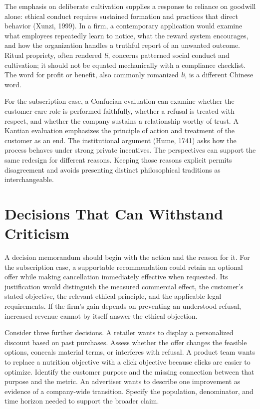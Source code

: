 The emphasis on deliberate cultivation supplies a response to reliance
on goodwill alone: ethical conduct requires sustained formation and
practices that direct behavior (Xunzi, 1999). In a firm, a contemporary
application would examine what employees repeatedly learn to notice,
what the reward system encourages, and how the organization handles a
truthful report of an unwanted outcome. Ritual propriety, often rendered
\emph{li}, concerns patterned social conduct and cultivation; it should
not be equated mechanically with a compliance checklist. The word for
profit or benefit, also commonly romanized \emph{li}, is a different
Chinese word.

For the subscription case, a Confucian evaluation can examine whether
the customer-care role is performed faithfully, whether a refusal is
treated with respect, and whether the company sustains a relationship
worthy of trust. A Kantian evaluation emphasizes the principle of action
and treatment of the customer as an end. The institutional argument
(Hume, 1741) asks how the process behaves under strong private
incentives. The perspectives can support the same redesign for different
reasons. Keeping those reasons explicit permits disagreement and avoids
presenting distinct philosophical traditions as interchangeable.


\hypertarget{M09-decisions-that-can-withstand-criticism}{%
\section{Decisions That Can Withstand
Criticism}\label{M09-decisions-that-can-withstand-criticism}}

\noindent \noindent A decision memorandum should begin with the action and the
reason for it. For the subscription case, a supportable recommendation
could retain an optional offer while making cancellation immediately
effective when requested. Its justification would distinguish the
measured commercial effect, the customer's stated objective, the
relevant ethical principle, and the applicable legal requirements. If
the firm's gain depends on preventing an understood refusal, increased
revenue cannot by itself answer the ethical objection.

Consider three further decisions. A retailer wants to display a
personalized discount based on past purchases. Assess whether the offer
changes the feasible options, conceals material terms, or interferes
with refusal. A product team wants to replace a nutrition objective with
a click objective because clicks are easier to optimize. Identify the
customer purpose and the missing connection between that purpose and the
metric. An advertiser wants to describe one improvement as evidence of a
company-wide transition. Specify the population, denominator, and time
horizon needed to support the broader claim.

